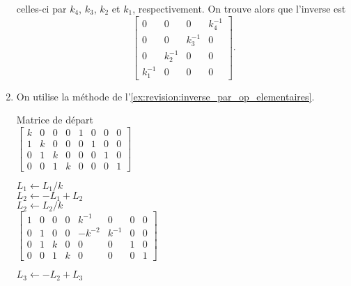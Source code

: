 \begin{exercice}
\begin{sol}
\begin{enumerate}
      celles-ci par $k_4$, $k_3$, $k_2$ et $k_1$, respectivement. On
      trouve alors que l'inverse est
      \begin{displaymath}
        \begin{bmatrix}
          0 & 0 & 0 & k_4^{-1} \\
          0 & 0 & k_3^{-1} & 0 \\
          0 & k_2^{-1} & 0 & 0 \\
          k_1^{-1} & 0 & 0 & 0
        \end{bmatrix}.
      \end{displaymath}
      \pagebreak[3]
    \item On utilise la méthode de l'\autoref{ex:revision:inverse_par_op_elementaires}.
      \setlength{\ocolumnsep}{\columnsep}
      \setlength{\columnsep}{-120pt}
      \begin{multicols}{2}
        Matrice de départ \\
        \columnbreak
        $%
        \left[
          \begin{array}{rrrr|rrrr}
            k & 0 & 0 & 0 & 1 & 0 & 0 & 0 \\
            1 & k & 0 & 0 & 0 & 1 & 0 & 0 \\
            0 & 1 & k & 0 & 0 & 0 & 1 & 0 \\
            0 & 0 & 1 & k & 0 & 0 & 0 & 1
          \end{array}
        \right]
        $
      \end{multicols}
      \begin{multicols}{2}
        $L_1 \leftarrow L_1/k$ \\
        $L_2 \leftarrow - L_1 + L_2$ \\
        $L_2 \leftarrow L_2/k$ \\
        \columnbreak
        $%
        \left[
          \begin{array}{rrrr|rrrr}
            1 & 0 & 0 & 0 &  k^{-1} &     0 & 0 & 0 \\
            0 & 1 & 0 & 0 & -k^{-2} & k^{-1} & 0 & 0 \\
            0 & 1 & k & 0 &       0 &     0 & 1 & 0 \\
            0 & 0 & 1 & k &       0 &     0 & 0 & 1
          \end{array}
        \right]
        $
      \end{multicols}
      \begin{multicols}{2}
        $L_3 \leftarrow - L_2 + L_3$ \\

\end{multicols}
\end{enumerate}
\end{sol}
\end{exercice}
